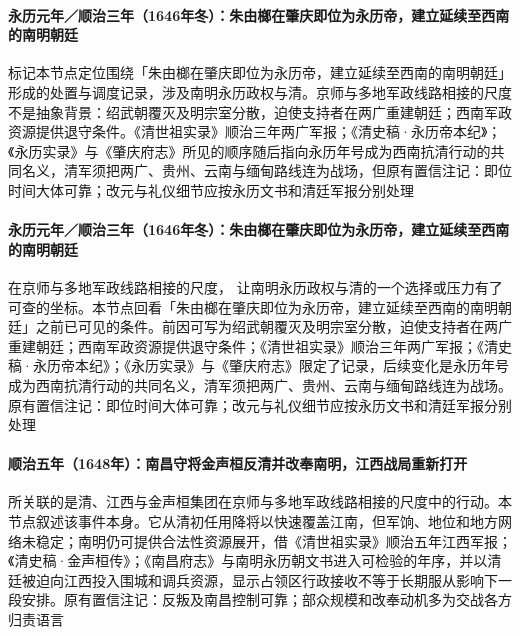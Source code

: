 \paragraph{永历元年／顺治三年（1646年冬）：朱由榔在肇庆即位为永历帝，建立延续至西南的南明朝廷}
 标记本节点定位围绕「朱由榔在肇庆即位为永历帝，建立延续至西南的南明朝廷」形成的处置与调度记录，涉及南明永历政权与清。京师与多地军政线路相接的尺度不是抽象背景：绍武朝覆灭及明宗室分散，迫使支持者在两广重建朝廷；西南军政资源提供退守条件。《清世祖实录》顺治三年两广军报；《清史稿·永历帝本纪》；《永历实录》与《肇庆府志》所见的顺序随后指向永历年号成为西南抗清行动的共同名义，清军须把两广、贵州、云南与缅甸路线连为战场，但原有置信注记：即位时间大体可靠；改元与礼仪细节应按永历文书和清廷军报分别处理

\paragraph{永历元年／顺治三年（1646年冬）：朱由榔在肇庆即位为永历帝，建立延续至西南的南明朝廷}
在京师与多地军政线路相接的尺度， 让南明永历政权与清的一个选择或压力有了可查的坐标。本节点回看「朱由榔在肇庆即位为永历帝，建立延续至西南的南明朝廷」之前已可见的条件。前因可写为绍武朝覆灭及明宗室分散，迫使支持者在两广重建朝廷；西南军政资源提供退守条件；《清世祖实录》顺治三年两广军报；《清史稿·永历帝本纪》；《永历实录》与《肇庆府志》限定了记录，后续变化是永历年号成为西南抗清行动的共同名义，清军须把两广、贵州、云南与缅甸路线连为战场。原有置信注记：即位时间大体可靠；改元与礼仪细节应按永历文书和清廷军报分别处理

\paragraph{顺治五年（1648年）：南昌守将金声桓反清并改奉南明，江西战局重新打开}
 所关联的是清、江西与金声桓集团在京师与多地军政线路相接的尺度中的行动。本节点叙述该事件本身。它从清初任用降将以快速覆盖江南，但军饷、地位和地方网络未稳定；南明仍可提供合法性资源展开，借《清世祖实录》顺治五年江西军报；《清史稿·金声桓传》；《南昌府志》与南明永历朝文书进入可检验的年序，并以清廷被迫向江西投入围城和调兵资源，显示占领区行政接收不等于长期服从影响下一段安排。原有置信注记：反叛及南昌控制可靠；部众规模和改奉动机多为交战各方归责语言

